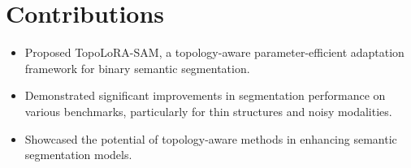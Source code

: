 \documentclass{article}
\begin{document}
\section*{Contributions}
\begin{itemize}
    \item Proposed TopoLoRA-SAM, a topology-aware parameter-efficient adaptation framework for binary semantic segmentation.
    \item Demonstrated significant improvements in segmentation performance on various benchmarks, particularly for thin structures and noisy modalities.
    \item Showcased the potential of topology-aware methods in enhancing semantic segmentation models.
\end{itemize}
\end{document}
